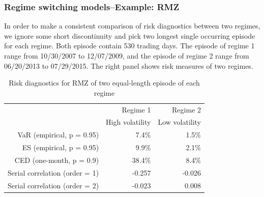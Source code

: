 \documentclass{beamer}
\newcommand\Fontviii{\fontsize{8}{9.2}\selectfont}
\begin{document}
\begin{frame}
\frametitle{Regime switching models--Example: RMZ}
\Fontviii

In order to make a consistent comparison of risk diagnostics between two regimes, we ignore some short discontinuity and pick two longest single occurring episode for each regime. Both episode contain 530 trading days. The episode of regime 1 range from 10/30/2007 to 12/07/2009, and the episode of regime 2 range from 06/20/2013 to 07/29/2015. The right panel shows risk measures of two regimes.

\begin{table}[h]
\centering 
\begin{tabular}{| r | r | r |} 
 \hline
& Regime 1 & Regime 2 \\
& High volatility & Low volatility \\
 \hline 
VaR (empirical, p = 0.95) & 7.4\% & 1.5\% \\
ES (empirical, p = 0.95) & 9.9\% & 2.1\% \\
CED (one-month, p = 0.9) & 38.4\% & 8.4\% \\
Serial correlation (order = 1) & -0.257 & -0.026 \\
Serial correlation (order = 2) & -0.023 & 0.008 \\
 \hline
\end{tabular}
\label{table:ridkDiagsRegimeRMZ}
\caption{Risk diagnostics for RMZ of two equal-length episode of each regime} 
\end{table}

\end{frame}

\end{document}
